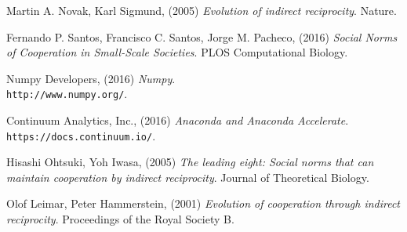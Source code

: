 \documentclass[10pt,a4paper]{article}
\begin{document}
\pagebreak
\begin{thebibliography}{9}

Martin A. Novak, Karl Sigmund, (2005) 
\textit{Evolution of indirect reciprocity}. 
Nature.

Fernando P. Santos, Francisco C. Santos, Jorge M. Pacheco, (2016) 
\textit{Social Norms of Cooperation in Small-Scale Societies}. 
PLOS Computational Biology.

Numpy Developers, (2016) 
\textit{Numpy}. 
\\\texttt{http://www.numpy.org/}.

Continuum Analytics, Inc., (2016) 
\textit{Anaconda and Anaconda Accelerate}. 
\\\texttt{https://docs.continuum.io/}.

Hisashi Ohtsuki, Yoh Iwasa, (2005) 
\textit{The leading eight: Social norms that can maintain cooperation by indirect reciprocity}. 
Journal of Theoretical Biology.

Olof Leimar, Peter Hammerstein, (2001) 
\textit{Evolution of cooperation through indirect reciprocity}. 
Proceedings of the Royal Society B.

\end{thebibliography}
\end{document}
